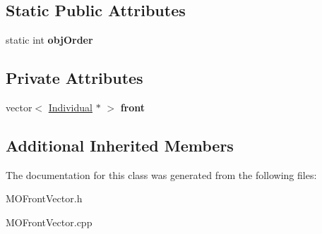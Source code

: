 \subsection*{Static Public Attributes}
\begin{DoxyCompactItemize}
\item 
\mbox{\label{classMOFrontVector_a40e2da74155fdb19404fa24a381e0aef}} 
static int {\bfseries obj\+Order}
\end{DoxyCompactItemize}
\subsection*{Private Attributes}
\begin{DoxyCompactItemize}
\item 
\mbox{\label{classMOFrontVector_aab766723ee771daa01a129fe4e489287}} 
vector$<$ \mbox{\hyperlink{classIndividual}{Individual}} $\ast$ $>$ {\bfseries front}
\end{DoxyCompactItemize}
\subsection*{Additional Inherited Members}


The documentation for this class was generated from the following files\+:\begin{DoxyCompactItemize}
\item 
M\+O\+Front\+Vector.\+h\item 
M\+O\+Front\+Vector.\+cpp\end{DoxyCompactItemize}
